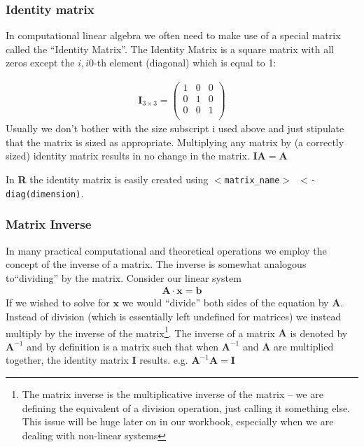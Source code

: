 \subsubsection{Identity matrix}
In computational linear algebra we often need to make use of a special matrix called the ``Identity Matrix''.  
The Identity Matrix is a square matrix with all zeros except the $i,i$0-th element (diagonal) which is equal to 1:

\begin{gather}
\mathbf{I}_{3\times3}=
\begin{pmatrix}
1 & 0 & 0\\
0 & 1 & 0\\
0 & 0 & 1\\
\end{pmatrix}
\end{gather}
Usually we don't bother with the size subscript i used above and just stipulate that the matrix is sized as appropriate.
Multiplying any matrix by (a correctly sized) identity matrix results in no change in the matrix.  $\mathbf{I}\mathbf{A} = \mathbf{A}$  

In \textbf{R} the identity matrix is easily created using \texttt{$<$matrix\_name$>$~$<$- diag(dimension)}.

\subsubsection{Matrix Inverse}
In many practical computational and theoretical operations we employ the concept of the inverse of a matrix.
The inverse is somewhat analogous to``dividing'' by the matrix.  
Consider our linear system 
\begin{gather}
\mathbf{A} \cdot \mathbf{x} = \mathbf{b}
\end{gather}
If we wished to solve for $\mathbf{x}$ we would ``divide'' both sides of the equation by $\mathbf{A}$.   
Instead of division (which is essentially left undefined for matrices) we instead multiply by the inverse of the matrix\footnote{The matrix inverse is the multiplicative inverse of the matrix -- we are defining the equivalent of a division operation, just calling it something else.  This issue will be huge later on in our workbook, especially when we are dealing with non-linear systems}.
The inverse of a matrix $\mathbf{A}$ is denoted by $\mathbf{A}^{-1}$ and by definition is a matrix such that when $\mathbf{A}^{-1}$ and $\mathbf{A}$ are multiplied together, the identity matrix $\mathbf{I}$ results.  e.g. $\mathbf{A}^{-1} \mathbf{A} = \mathbf{I}$

